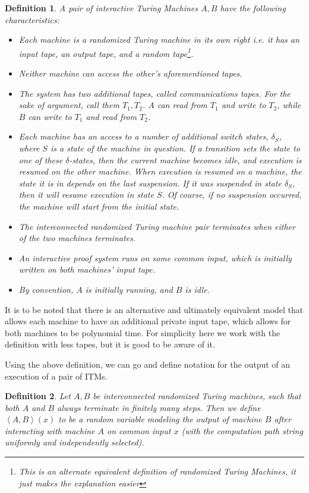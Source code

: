\documentclass{article}
\newtheorem{definition}{Definition}
\begin{document}
\begin{definition}
    A pair of interactive Turing Machines $A, B$ have the following characteristics:
    \begin{itemize}
        \item Each machine is a randomized Turing machine in its own right i.e. it has an input tape, an output tape, and a random tape\footnote{This is an alternate equivalent definition of randomized Turing Machines, it just makes the explanation easier}.
        \item Neither machine can access the other's aforementioned tapes.
        \item The system has two additional tapes, called communications tapes. For the sake of argument, call them $T_1, T_2$. $A$ can read from $T_1$ and write to $T_2$, while $B$ can write to $T_1$ and read from $T_2$.
        \item Each machine has an access to a number of additional switch states, $\delta_S$, where $S$ is a state of the machine in question. If a transition sets the state to one of these $\delta$-states, then the current machine becomes idle, and execution is resumed on the other machine. When execution is resumed on a machine, the state it is in depends on the last suspension. If it was suspended in state $\delta_S$, then it will resume execution in state $S$. Of course, if no suspension occurred, the machine will start from the initial state.
        \item The interconnected randomized Turing machine pair terminates when either of the two machines terminates.
        \item An interactive proof system runs on some common input, which is initially written on both machines' input tape.
        \item By convention, $A$ is initially running, and $B$ is idle.
    \end{itemize}
\end{definition}

It is to be noted that there is an alternative and ultimately equivalent model that allows each machine to have an additional private input tape, which allows for both machines to be polynomial time. For simplicity here we work with the definition with less tapes, but it is good to be aware of it.

Using the above definition, we can go and define notation for the output of an execution of a pair of ITMs.

\begin{definition}
    Let $A, B$ be interconnected randomized Turing machines, such that both $A$ and $B$ always terminate in finitely many steps. Then we define $\left<A, B \right>(x)$ to be a random variable modeling the output of machine $B$ after interacting with machine $A$ on common input $x$ (with the computation path string uniformly and independently selected).
\end{definition}
\end{document}

